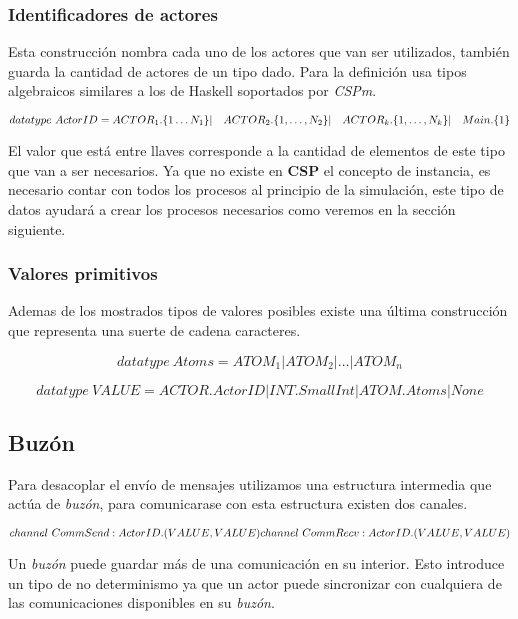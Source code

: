 \documentclass[fleqn]{article}
\begin{document}
\subsubsection{Identificadores de actores}

Esta construcción nombra cada uno de los actores que van ser utilizados, también
guarda la cantidad de actores de un tipo dado. Para la definición usa tipos algebraicos
similares a los de Haskell soportados por \textit{CSPm}.

\[
  datatype\ ActorID = ACTOR_1.\{1 \ldots N_1\} | \\
  \quad ACTOR_2.\{1, \ldots ,N_2\} | \\
  \quad ACTOR_k.\{1, \ldots, N_k\} | \\
  \quad Main.\{1\}
\]

El valor que está entre llaves corresponde a la cantidad de elementos de este
tipo que van a ser necesarios. Ya que no existe en \textbf{CSP} el concepto de
instancia, es necesario contar con todos los procesos al principio de la
simulación, este tipo de datos ayudará a crear los procesos necesarios como
veremos en la sección siguiente.


\subsubsection{Valores primitivos}

Ademas de los mostrados tipos de valores posibles existe una última construcción
que representa una suerte de cadena caracteres.

\[
  datatype\ Atoms = ATOM_1 | ATOM_2 | \ldots | ATOM_n
\]



\[
  datatype\ VALUE = ACTOR.ActorID | INT.SmallInt | ATOM.Atoms | None
\]

\subsection{Buzón}

Para desacoplar el envío de mensajes utilizamos una estructura intermedia que
actúa de \textit{buzón}, para comunicarase con esta estructura existen dos canales.

\[
channel\ CommSend:ActorID.(VALUE, VALUE)\\
channel\ CommRecv:ActorID.(VALUE, VALUE)
\]

Un \textit{buzón} puede guardar más de una comunicación en su interior. Esto
introduce un tipo de no determinismo ya que un actor puede sincronizar con cualquiera
de las comunicaciones disponibles en su \textit{buzón}.
\end{document}
